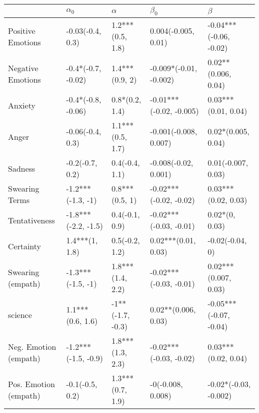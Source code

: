 \begin{tabular}{lllll}
\toprule
{} &           $\alpha_0$ &          $\alpha$ &                $\beta_0$ &                 $\beta$ \\
\midrule
Positive Emotions     &     -0.03(-0.4, 0.3) &  1.2***(0.5, 1.8) &      0.004(-0.005, 0.01) &  -0.04***(-0.06, -0.02) \\
Negative Emotions     &   -0.4*(-0.7, -0.02) &    1.4***(0.9, 2) &   -0.009*(-0.01, -0.002) &     0.02**(0.006, 0.04) \\
Anxiety               &   -0.4*(-0.8, -0.06) &    0.8*(0.2, 1.4) &  -0.01***(-0.02, -0.005) &     0.03***(0.01, 0.04) \\
Anger                 &     -0.06(-0.4, 0.3) &  1.1***(0.5, 1.7) &    -0.001(-0.008, 0.007) &      0.02*(0.005, 0.04) \\
Sadness               &      -0.2(-0.7, 0.2) &    0.4(-0.4, 1.1) &     -0.008(-0.02, 0.001) &      0.01(-0.007, 0.03) \\
Swearing Terms        &    -1.2***(-1.3, -1) &    0.8***(0.5, 1) &   -0.02***(-0.02, -0.02) &     0.03***(0.02, 0.03) \\
Tentativeness         &  -1.8***(-2.2, -1.5) &    0.4(-0.1, 0.9) &   -0.02***(-0.03, -0.01) &          0.02*(0, 0.03) \\
Certainty             &       1.4***(1, 1.8) &    0.5(-0.2, 1.2) &      0.02***(0.01, 0.03) &         -0.02(-0.04, 0) \\
Swearing (empath)     &    -1.3***(-1.5, -1) &  1.8***(1.4, 2.2) &   -0.02***(-0.03, -0.01) &    0.02***(0.007, 0.03) \\
science               &     1.1***(0.6, 1.6) &  -1**(-1.7, -0.3) &      0.02**(0.006, 0.03) &  -0.05***(-0.07, -0.04) \\
Neg. Emotion (empath) &  -1.2***(-1.5, -0.9) &  1.8***(1.3, 2.3) &   -0.02***(-0.03, -0.02) &     0.03***(0.02, 0.04) \\
Pos. Emotion (empath) &      -0.1(-0.5, 0.2) &  1.3***(0.7, 1.9) &        -0(-0.008, 0.008) &   -0.02*(-0.03, -0.002) \\
\bottomrule
\end{tabular}
